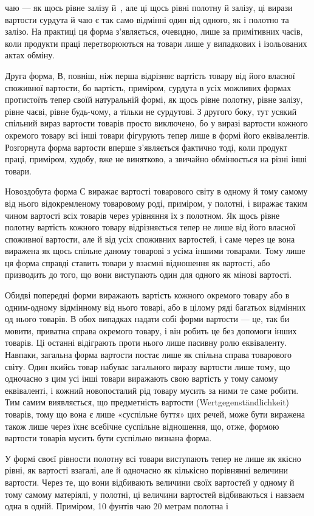 \parcont{}  %
чаю — як щось рівне залізу й~, але ці щось рівні полотну
й залізу, ці вирази вартости сурдута й чаю є так само відмінні
один від одного, як і полотно та залізо. На практиці ця форма
з’являється, очевидно, лише за примітивних часів, коли продукти
праці перетворюються на товари лише у випадкових і ізольованих
актах обміну.

Друга форма, $В$, повніш, ніж перша відрізняє вартість товару від
його власної споживної вартости, бо вартість, приміром, сурдута
в усіх можливих формах протистоїть тепер своїй натуральній
формі, як щось рівне полотну, рівне залізу, рівне чаєві, рівне
будь-чому, а тільки не сурдутові. З другого боку, тут усякий
спільний вираз вартости товарів просто виключено, бо у виразі
вартости кожного окремого товару всі інші товари фігурують
тепер лише в формі його еквівалентів. Розгорнута форма вартости
вперше з’являється фактично тоді, коли продукт праці, приміром,
худобу, вже не винятково, а звичайно обмінюється на різні інші
товари.

Новоздобута форма $С$ виражає вартості товарового світу в
одному й тому самому від нього відокремленому товаровому роді,
приміром, у полотні, і виражає таким чином вартості всіх товарів
через урівняння їх з полотном. Як щось рівне полотну вартість
кожного товару відрізняється тепер не лише від його власної
споживної вартости, але й від усіх споживних вартостей, і саме
через це вона виражена як щось спільне даному товарові з усіма
іншими товарами. Тому лише ця форма справді ставить товари у
взаємні відношення як вартості, або призводить до того, що вони
виступають один для одного як мінові вартості.

Обидві попередні форми виражають вартість кожного окремого
товару або в одним-одному відмінному від нього товарі, або в
цілому ряді багатьох відмінних од нього товарів. В обох випадках
надати собі форми вартости — це, так би мовити, приватна справа
окремого товару, і він робить це без допомоги інших товарів. Ці
останні відіграють проти нього лише пасивну ролю еквіваленту.
Навпаки, загальна форма вартости постає лише як спільна справа
товарового світу. Один якийсь товар набуває загального виразу
вартости лише тому, що одночасно з цим усі інші товари виражають
свою вартість у тому самому еквіваленті, і кожний новопосталий
рід товару мусить за ними те саме робити. Тим самим виявляється,
що предметність вартости (Wertgegenständlichkeit)
товарів, тому що вона є лише «суспільне буття» цих речей, може
бути виражена також лише через їхнє всебічне суспільне відношення,
що, отже, формою вартости товарів мусить бути суспільно
визнана форма.

У формі своєї рівности полотну всі товари виступають тепер
не лише як якісно рівні, як вартості взагалі, але й одночасно як
кількісно порівнянні величини вартости. Через те, що вони відбивають
величини своїх вартостей у одному й тому самому матеріялі,
у полотні, ці величини вартостей відбиваються і навзаєм
одна в одній. Приміром, 10 фунтів чаю \deq{} 20 метрам полотна і
\parbreak{}  %
